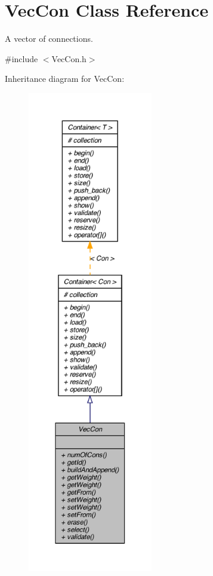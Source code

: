 \hypertarget{class_vec_con}{
\section{VecCon Class Reference}
\label{class_vec_con}
}


A vector of connections.  




{\ttfamily \#include $<$VecCon.h$>$}



Inheritance diagram for VecCon:
\nopagebreak
\begin{figure}[H]
\begin{center}
\leavevmode
\includegraphics[height=600pt]{class_vec_con__inherit__graph}
\end{center}
\end{figure}


